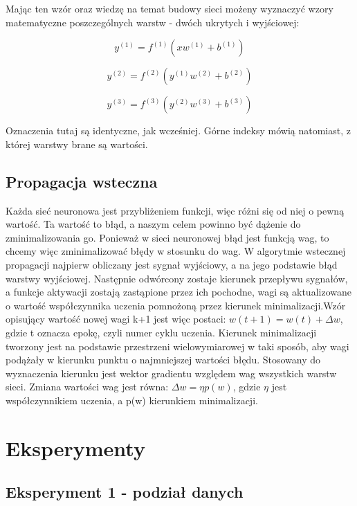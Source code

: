 \documentclass[a4paper, 12pt]{report}
\begin{document}
Mając ten wzór oraz wiedzę na temat budowy sieci możeny wyznaczyć wzory matematyczne poszczególnych warstw - dwóch ukrytych i wyjściowej:

$$y^{(1)} = f^{(1)}\left(  xw^{(1)} + b^{(1)} \right)$$

$$y^{(2)} = f^{(2)}\left( y^{(1)}w^{(2)} + b^{(2)} \right)$$

$$y^{(3)} = f^{(3)} \left( y^{(2)}w^{(3)} + b^{(3)} \right)$$

Oznaczenia tutaj są identyczne, jak wcześniej. Górne indeksy mówią natomiast, z której warstwy brane są wartości.
\newpage

\section{Propagacja wsteczna}
Każda sieć neuronowa jest przybliżeniem funkcji, więc różni się od niej o pewną wartość. Ta wartość to błąd, a naszym celem powinno być dążenie do zminimalizowania go. Ponieważ w sieci neuronowej błąd jest funkcją wag, to chcemy więc zminimalizować błędy w stosunku do wag. W algorytmie wstecznej propagacji najpierw obliczany jest sygnał wyjściowy, a na jego podstawie błąd warstwy wyjściowej. Następnie odwórcony zostaje kierunek przepływu sygnałów, a funkcje aktywacji zostają zastąpione przez ich pochodne, wagi są aktualizowane o wartość współczynnika uczenia pomnożoną przez kierunek minimalizacji.Wzór opisujący wartość nowej wagi k+1 jest więc postaci: $w (t + 1) = w(t) + \Delta w$, gdzie t oznacza epokę, czyli numer cyklu uczenia. Kierunek minimalizacji tworzony jest na podstawie przestrzeni wielowymiarowej w taki sposób, aby wagi podążały w kierunku punktu o najmniejszej wartości błędu. Stosowany do wyznaczenia kierunku jest wektor gradientu względem wag wszystkich warstw sieci. Zmiana wartości wag jest równa: $\Delta w = \eta p(w)$, gdzie $\eta$ jest współczynnikiem uczenia, a p(w) kierunkiem minimalizacji.



\chapter{Eksperymenty}
\section{Eksperyment 1 - podział danych}
\end{document}
